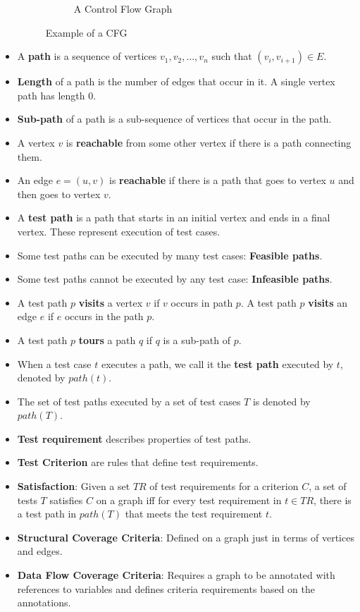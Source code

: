 \documentclass[a4paper]{article}
\begin{document}
\begin{itemize}
\begin{figure}[H]
\begin{subfigure}[b]{0.45\textwidth}
            \caption{A Control Flow Graph}
        \end{subfigure}
        \caption{Example of a CFG}
    \end{figure}
    \item A \textbf{path} is a sequence of vertices $v_1,v_2,...,v_n$ such that $(v_i,v_{i+1})\in E$.
    \item \textbf{Length} of a path is the number of edges that occur in it. A single vertex path has length 0.
    \item \textbf{Sub-path} of a path is a sub-sequence of vertices that occur in the path.
    \item A vertex $v$ is \textbf{reachable} from some other vertex if there is a path connecting them.
    \item An edge $e=(u,v)$ is \textbf{reachable} if there is a path that goes to vertex $u$ and then goes to vertex $v$.
    \item A \textbf{test path} is a path that starts in an initial vertex and ends in a final vertex. These represent execution of test cases.
    \item Some test paths can be executed by many test cases: \textbf{Feasible paths}.
    \item Some test paths cannot be executed by any test case: \textbf{Infeasible paths}.
    \item A test path $p$ \textbf{visits} a vertex $v$ if $v$ occurs in path $p$. A test path $p$ \textbf{visits} an edge $e$ if $e$ occurs in the path $p$.
    \item A test path $p$ \textbf{tours} a path $q$ if $q$ is a sub-path of $p$.
    \item When a test case $t$ executes a path, we call it the \textbf{test path} executed by $t$, denoted by $path(t)$.
    \item The set of test paths executed by a set of test cases $T$ is denoted by $path(T)$.
    \item \textbf{Test requirement} describes properties of test paths.
    \item \textbf{Test Criterion} are rules that define test requirements.
    \item \textbf{Satisfaction}: Given a set $TR$ of test requirements for a criterion $C$, a set of tests $T$ satisfies $C$ on a graph iff for every test requirement in $t\in TR$, there is a test path in $path(T)$ that meets the test requirement $t$.
    \item \textbf{Structural Coverage Criteria}: Defined on a graph just in terms of vertices and edges.
    \item \textbf{Data Flow Coverage Criteria}: Requires a graph to be annotated with references to variables and defines criteria requirements based on the annotations.
\end{itemize}
\end{document}
